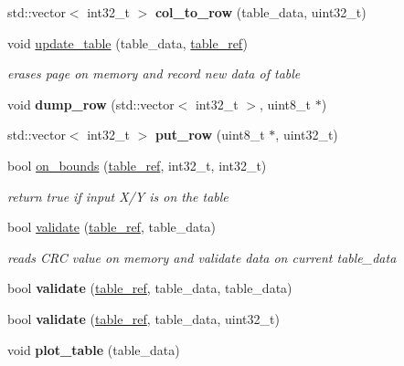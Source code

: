 \begin{DoxyCompactItemize}
std\+::vector$<$ int32\+\_\+t $>$ {\bfseries col\+\_\+to\+\_\+row} (table\+\_\+data, uint32\+\_\+t)
\item 
\mbox{\label{namespacetables_a609889745ffc450440eee727f8d28034}} 
void \hyperlink{namespacetables_a609889745ffc450440eee727f8d28034}{update\+\_\+table} (table\+\_\+data, \hyperlink{structtable__ref}{table\+\_\+ref})
\begin{DoxyCompactList}\small\item\em erases page on memory and record new data of table \end{DoxyCompactList}\item 
\mbox{\label{namespacetables_a3d4eae2328222f2672364baad17b14eb}} 
void {\bfseries dump\+\_\+row} (std\+::vector$<$ int32\+\_\+t $>$, uint8\+\_\+t $\ast$)
\item 
\mbox{\label{namespacetables_aacb653c68579815b85eca89c831e9300}} 
std\+::vector$<$ int32\+\_\+t $>$ {\bfseries put\+\_\+row} (uint8\+\_\+t $\ast$, uint32\+\_\+t)
\item 
\mbox{\label{namespacetables_a5df27daa6f33383e90a21d0ea12f6d9f}} 
bool \hyperlink{namespacetables_a5df27daa6f33383e90a21d0ea12f6d9f}{on\+\_\+bounds} (\hyperlink{structtable__ref}{table\+\_\+ref}, int32\+\_\+t, int32\+\_\+t)
\begin{DoxyCompactList}\small\item\em return true if input X/Y is on the table \end{DoxyCompactList}\item 
\mbox{\label{namespacetables_ad914a29af149c1059b5fcfb1501f6d87}} 
bool \hyperlink{namespacetables_ad914a29af149c1059b5fcfb1501f6d87}{validate} (\hyperlink{structtable__ref}{table\+\_\+ref}, table\+\_\+data)
\begin{DoxyCompactList}\small\item\em reads C\+RC value on memory and validate data on current table\+\_\+data \end{DoxyCompactList}\item 
\mbox{\label{namespacetables_a2663a4b36458007a02e8d2ddb20801f5}} 
bool {\bfseries validate} (\hyperlink{structtable__ref}{table\+\_\+ref}, table\+\_\+data, table\+\_\+data)
\item 
\mbox{\label{namespacetables_a6152b4e661d9d371ed4580b80f5f9b80}} 
bool {\bfseries validate} (\hyperlink{structtable__ref}{table\+\_\+ref}, table\+\_\+data, uint32\+\_\+t)
\item 
\mbox{\label{namespacetables_acfce212d9f061ab7df55e665ab89932b}} 
void {\bfseries plot\+\_\+table} (table\+\_\+data)
\end{DoxyCompactItemize}



